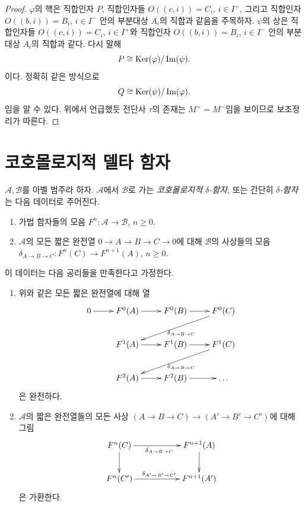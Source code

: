 \begin{proof}
\medskip\noindent
$\varphi$의 핵은 직합인자 $P$, 직합인자들
$O((c, i)) = C_i$, $i \in I^{+}$, 그리고 직합인자
$O((b, i)) = B_i$, $i \in I^{-}$ 안의 부분대상 $A_i$의 직합과
같음을 주목하자. $\psi$의 상은 직합인자들
$O((c, i)) = C_i$, $i \in I^{+}$와 직합인자
$O((b, i)) = B_i$, $i \in I^{-}$ 안의 부분대상 $A_i$의 직합과
같다. 다시 말해
$$
P \cong \mathop{\mathrm{Ker}}(\varphi)/\mathop{\mathrm{Im}}(\psi).
$$
이다. 정확히 같은 방식으로
$$
Q \cong \mathop{\mathrm{Ker}}(\psi)/\mathop{\mathrm{Im}}(\varphi).
$$
임을 알 수 있다. 위에서 언급했듯 전단사 $\tau$의 존재는
$M^{+} = M^{-}$임을 보이므로 보조정리가 따른다.
\end{proof}






\section{코호몰로지적 델타 함자}
\label{section-cohomological-delta-functor}

\begin{definition}
\label{definition-cohomological-delta-functor}
$\mathcal{A}, \mathcal{B}$를 아벨 범주라 하자.
$\mathcal{A}$에서 $\mathcal{B}$로 가는 {\it 코호몰로지적
$\delta$-함자}, 또는 간단히 {\it $\delta$-함자}는 다음 데이터로
주어진다.
\begin{enumerate}
\item 가법 함자들의 모음
$F^n : \mathcal{A} \to \mathcal{B}$, $n \geq 0$.
\item $\mathcal{A}$의 모든 짧은 완전열
$0 \to A \to B \to C \to 0$에 대해 $\mathcal{B}$의 사상들의 모음
$\delta_{A \to B \to C} : F^n(C) \to F^{n + 1}(A)$, $n \geq 0$.
\end{enumerate}
이 데이터는 다음 공리들을 만족한다고 가정한다.
\begin{enumerate}
\item 위와 같은 모든 짧은 완전열에 대해 열
$$
\xymatrix{
0 \ar[r] &
F^0(A) \ar[r] &
F^0(B) \ar[r] &
F^0(C) \ar[lld]^{\delta_{A \to B \to C}} \\
 &
F^1(A) \ar[r] &
F^1(B) \ar[r] &
F^1(C) \ar[lld]^{\delta_{A \to B \to C}} \\
 &
F^2(A) \ar[r] &
F^2(B) \ar[r] &
\ldots
}
$$
은 완전하다.
\item $\mathcal{A}$의 짧은 완전열들의 모든 사상
$(A \to B \to C) \to (A' \to B' \to C')$에 대해 그림
$$
\xymatrix{
F^n(C) \ar[d] \ar[rr]_{\delta_{A \to B \to C}} & & F^{n + 1}(A) \ar[d] \\
F^n(C') \ar[rr]^{\delta_{A' \to B' \to C'}} & & F^{n + 1}(A')
}
$$
은 가환한다.
\end{enumerate}
\end{definition}

